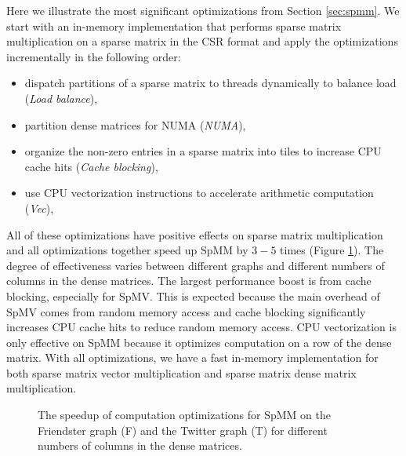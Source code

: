 Here we illustrate the most significant optimizations from Section
\ref{sec:spmm}. We start with an in-memory implementation that
performs sparse matrix multiplication on a sparse matrix in the CSR format
and apply the optimizations incrementally in the following order:
\begin{itemize} \itemsep1pt \parskip0pt 
	\item dispatch partitions of a sparse matrix to threads dynamically
		to balance load (\textit{Load balance}),
	\item partition dense matrices for NUMA (\textit{NUMA}),
	\item organize the non-zero entries in a sparse matrix into tiles to
		increase CPU cache hits (\textit{Cache blocking}),
	\item use CPU vectorization instructions to accelerate arithmetic
		computation (\textit{Vec}),
\end{itemize}

All of these optimizations have positive effects on sparse matrix
multiplication and all optimizations together speed up SpMM by $3-5$ times
(Figure \ref{perf:spmm_opt}). The degree of effectiveness
varies between different graphs and different numbers of columns in
the dense matrices. The largest performance boost is from cache blocking,
especially for SpMV.
This is expected because the main overhead of SpMV comes from random memory
access and cache blocking significantly increases CPU cache hits to reduce
random memory access. CPU vectorization is only effective on SpMM because
it optimizes computation on a row of the dense matrix.
With all optimizations, we have a fast in-memory implementation for both
sparse matrix vector multiplication and sparse matrix dense matrix multiplication.

\begin{figure}
	\begin{center}
		\footnotesize
		
		\caption{The speedup of computation optimizations for SpMM on the Friendster
			graph (F) and the Twitter graph (T) for different numbers of
			columns in the dense matrices.}
		\label{perf:spmm_opt}
	\end{center}
\end{figure}

